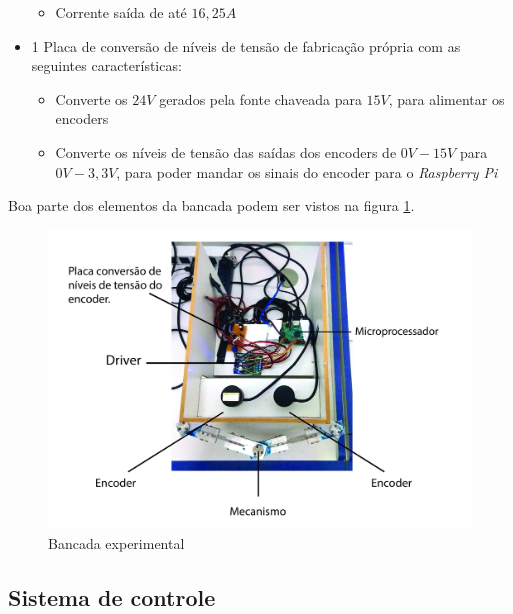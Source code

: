 \documentclass[]{politex}
\begin{document}
\begin{itemize}
\begin{itemize}
\item Corrente saída de até $16{,}25A$
\end{itemize}
\item 1 Placa de conversão de níveis de tensão de fabricação própria com as seguintes características:
\begin{itemize}
\item Converte os $24V$ gerados pela fonte chaveada para $15V$, para alimentar os encoders
\item Converte os níveis de tensão das saídas dos encoders de $0V-15V$ para $0V-3{,}3V$, para poder mandar os sinais do encoder para o \textit{Raspberry Pi}
\end{itemize}
\end{itemize}

Boa parte dos elementos da bancada podem ser vistos na figura \ref{fig:BancadaClara1}.

\begin{figure}[H]
    \centering
    \includegraphics[scale=0.1]{imagens/BancadaClara1.jpg}
    \caption{Bancada experimental}
    \label{fig:BancadaClara1}
\end{figure}


\subsection{Sistema de controle}
\end{document}
